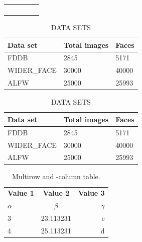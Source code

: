 \documentclass{article}
\begin{document}
\begin{table}[]
\begin{tabular}{lllll}
 &  &  &  &  \\
 &  &  &  &  \\
 &  &  &  &  \\
 &  &  &  & 
\end{tabular}
\end{table}

\renewcommand\arraystretch{1.5} %
\begin{table}[htbp] %
      \setlength{\abovecaptionskip}{0cm} %
      \setlength{\belowcaptionskip}{0.2cm}
   \centering
   \caption{\label{tab:l2}DATA SETS} 
   \begin{tabular}{p{2.3cm}<{\centering}p{2.3cm}<{\centering}p{2.3cm}<{\centering}} %
      \hline
      Data set& Total images & Faces \\ 
       \hline
      FDDB& 2845 & 5171 \\ 
      WIDER\_FACE& 30000 & 40000 \\  
      ALFW& 25000 & 25993 \\ 
      \hline
   \end{tabular}
   \begin{tabular}{p{2.3cm}<{\centering}p{2.3cm}<{\centering}p{2.3cm}<{\centering}} %
      \hline
      Data set& Total images & Faces \\ 
       \hline
      FDDB& 2845 & 5171 \\ 
      WIDER\_FACE& 30000 & 40000 \\  
      ALFW& 25000 & 25993 \\ 
      \hline
   \end{tabular}
\end{table}


\begin{table}[h!]
  \begin{center}
    \caption{Multirow and -column table.}
    \label{tab:table1}
    \begin{tabular}{l|c|r}
      \textbf{Value 1} & \textbf{Value 2} & \textbf{Value 3}\\
      $\alpha$ & $\beta$ & $\gamma$ \\
      3 & 23.113231 & c\\
      4 & 25.113231 & d\\
    \end{tabular}
  \end{center}
\end{table}
\end{document}
